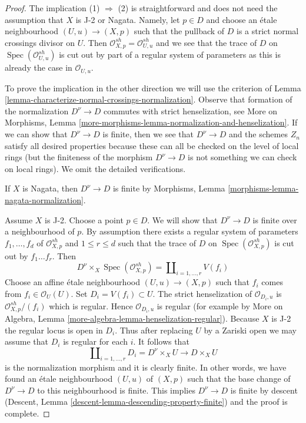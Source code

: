 \documentclass{stacks-project}
\theoremstyle{plain}
\theoremstyle{definition}
\theoremstyle{remark}
\numberwithin{equation}{subsection}
\def\Spec{\mathop{\mathrm{Spec}}}
\begin{document}
\begin{proof}
The implication (1) $\Rightarrow$ (2) is straightforward and
does not need the assumption that $X$ is J-2 or Nagata.
Namely, let $p \in D$ and choose an \'etale neighbourhood
$(U, u) \to (X, p)$ such that the pullback of $D$ is
a strict normal crossings divisor on $U$.
Then $\mathcal{O}_{X, p}^{sh} = \mathcal{O}_{U, u}^{sh}$
and we see that the trace of $D$ on $\Spec(\mathcal{O}_{U, u}^{sh})$
is cut out by part of a regular system of parameters
as this is already the case in $\mathcal{O}_{U, u}$.

\medskip\noindent
To prove the implication in the other direction
we will use the criterion of
Lemma \ref{lemma-characterize-normal-crossings-normalization}.
Observe that formation of the normalization $D^\nu \to D$
commutes with strict henselization, see
More on Morphisms, Lemma
\ref{more-morphisms-lemma-normalization-and-henselization}.
If we can show that $D^\nu \to D$ is finite,
then we see that $D^\nu \to D$ and the schemes
$Z_n$ satisfy all desired properties because these
can all be checked on the level of local rings
(but the finiteness of the morphism $D^\nu \to D$
is not something we can check on local rings).
We omit the detailed verifications.

\medskip\noindent
If $X$ is Nagata, then $D^\nu \to D$ is finite by
Morphisms, Lemma \ref{morphisms-lemma-nagata-normalization}.

\medskip\noindent
Assume $X$ is J-2. Choose a point $p \in D$. We will show
that $D^\nu \to D$ is finite over a neighbourhood of $p$.
By assumption there exists a regular system of
parameters $f_1, \ldots, f_d$ of $\mathcal{O}_{X, p}^{sh}$
and $1 \leq r \leq d$ such that the trace of $D$ on
$\Spec(\mathcal{O}_{X, p}^{sh})$ is cut out by $f_1 \ldots f_r$.
Then
$$
D^\nu \times_X \Spec(\mathcal{O}_{X, p}^{sh}) = 
\coprod\nolimits_{i = 1, \ldots, r} V(f_i)
$$
Choose an affine \'etale neighbourhood
$(U, u) \to (X, p)$ such that $f_i$ comes from
$f_i \in \mathcal{O}_U(U)$. Set $D_i = V(f_i) \subset U$.
The strict henselization of $\mathcal{O}_{D_i, u}$
is $\mathcal{O}_{X, p}^{sh}/(f_i)$ which is regular.
Hence $\mathcal{O}_{D_i, u}$ is regular (for example by
More on Algebra, Lemma \ref{more-algebra-lemma-henselization-regular}).
Because $X$ is J-2 the regular locus is open in $D_i$.
Thus after replacing $U$ by a Zariski open we may assume
that $D_i$ is regular for each $i$. It follows that
$$
\coprod\nolimits_{i = 1, \ldots, r} D_i = D^\nu \times_X U
\longrightarrow D \times_X U
$$
is the normalization morphism and it is clearly finite.
In other words, we have found
an \'etale neighbourhood $(U, u)$ of $(X, p)$ such that
the base change of $D^\nu \to D$ to this neighbourhood is finite.
This implies $D^\nu \to D$ is finite by descent
(Descent, Lemma \ref{descent-lemma-descending-property-finite})
and the proof is complete.
\end{proof}











\end{document}
